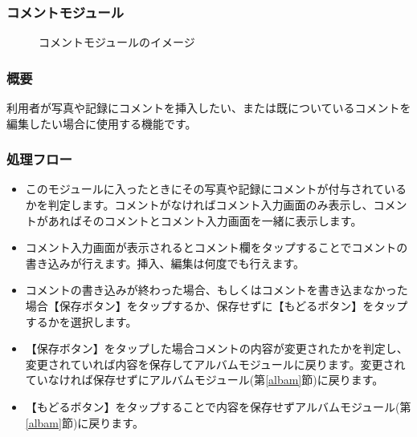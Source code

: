 \documentclass[a4j]{jarticle}
\begin{document}
\subsubsection{コメントモジュール\label{coment}}
\begin{figure}[H]
    \begin{center}
    \caption {コメントモジュールのイメージ}
    \label{functionselection}
    \end{center}
\end{figure}

\subsubsection*{概要}
利用者が写真や記録にコメントを挿入したい、または既についているコメントを編集したい場合に使用する機能です。

\subsubsection*{処理フロー}
\begin{itemize}
\item このモジュールに入ったときにその写真や記録にコメントが付与されているかを判定します。コメントがなければコメント入力画面のみ表示し、コメントがあればそのコメントとコメント入力画面を一緒に表示します。
\item コメント入力画面が表示されるとコメント欄をタップすることでコメントの書き込みが行えます。挿入、編集は何度でも行えます。
\item コメントの書き込みが終わった場合、もしくはコメントを書き込まなかった場合【保存ボタン】をタップするか、保存せずに【もどるボタン】をタップするかを選択します。
\item 【保存ボタン】をタップした場合コメントの内容が変更されたかを判定し、変更されていれば内容を保存してアルバムモジュールに戻ります。変更されていなければ保存せずにアルバムモジュール(第\ref{albam}節)に戻ります。
\item 【もどるボタン】をタップすることで内容を保存せずアルバムモジュール(第\ref{albam}節)に戻ります。
\end{itemize}
\newpage
\end{document}
